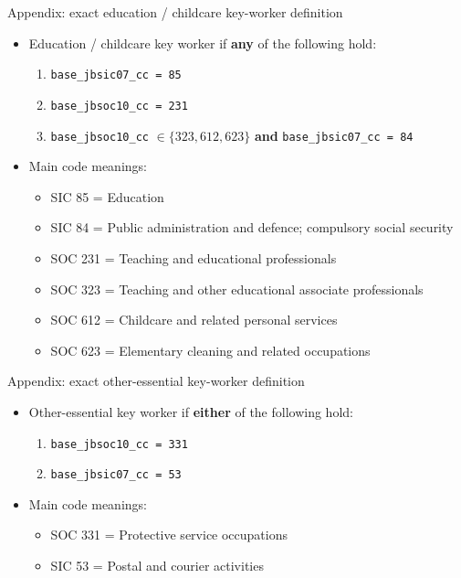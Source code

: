 \documentclass[aspectratio=169,11pt]{beamer}
\begin{document}
\begin{frame}{Appendix: exact education / childcare key-worker definition} \label{edu-keyworker-sec}
\begin{itemize}
  \item Education / childcare key worker if \textbf{any} of the following hold:
    \begin{enumerate}
      \item \texttt{base\_jbsic07\_cc = 85}
      \item \texttt{base\_jbsoc10\_cc = 231}
      \item \texttt{base\_jbsoc10\_cc} $\in \{323,612,623\}$ \textbf{and} \texttt{base\_jbsic07\_cc = 84}
    \end{enumerate}
  \item Main code meanings:
    \begin{itemize}
      \item SIC 85 = Education
      \item SIC 84 = Public administration and defence; compulsory social security
      \item SOC 231 = Teaching and educational professionals
      \item SOC 323 = Teaching and other educational associate professionals
      \item SOC 612 = Childcare and related personal services
      \item SOC 623 = Elementary cleaning and related occupations
    \end{itemize}
\end{itemize}

\hyperlink{group_defs}{}
\end{frame}

\begin{frame}{Appendix: exact other-essential key-worker definition} \label{other-keyworker-sec}
\begin{itemize}
  \item Other-essential key worker if \textbf{either} of the following hold:
    \begin{enumerate}
      \item \texttt{base\_jbsoc10\_cc = 331}
      \item \texttt{base\_jbsic07\_cc = 53}
    \end{enumerate}
  \item Main code meanings:
    \begin{itemize}
      \item SOC 331 = Protective service occupations
      \item SIC 53 = Postal and courier activities
    \end{itemize}
\end{itemize}

\hyperlink{group_defs}{}
\end{frame}
\end{document}
